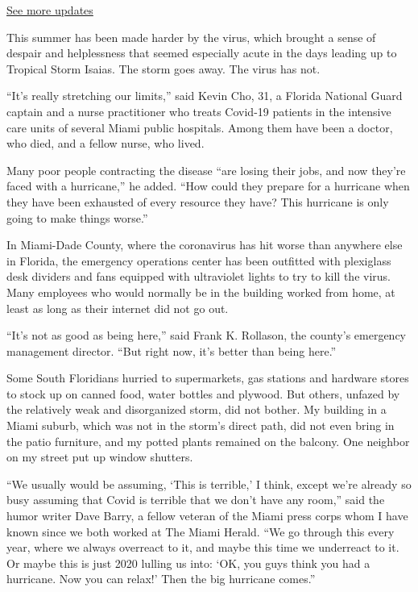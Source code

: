 \href{https://www.nytimes.com/2020/08/04/us/isaias-storm-updates.html?action=click\&pgtype=Article\&state=default\&region=MAIN_CONTENT_1\&context=storylines_live_updates}{See
more updates}

This summer has been made harder by the virus, which brought a sense of
despair and helplessness that seemed especially acute in the days
leading up to Tropical Storm Isaias. The storm goes away. The virus has
not.

``It's really stretching our limits,'' said Kevin Cho, 31, a Florida
National Guard captain and a nurse practitioner who treats Covid-19
patients in the intensive care units of several Miami public hospitals.
Among them have been a doctor, who died, and a fellow nurse, who lived.

Many poor people contracting the disease ``are losing their jobs, and
now they're faced with a hurricane,'' he added. ``How could they prepare
for a hurricane when they have been exhausted of every resource they
have? This hurricane is only going to make things worse.''

In Miami-Dade County, where the coronavirus has hit worse than anywhere
else in Florida, the emergency operations center has been outfitted with
plexiglass desk dividers and fans equipped with ultraviolet lights to
try to kill the virus. Many employees who would normally be in the
building worked from home, at least as long as their internet did not go
out.

``It's not as good as being here,'' said Frank K. Rollason, the county's
emergency management director. ``But right now, it's better than being
here.''

Some South Floridians hurried to supermarkets, gas stations and hardware
stores to stock up on canned food, water bottles and plywood. But
others, unfazed by the relatively weak and disorganized storm, did not
bother. My building in a Miami suburb, which was not in the storm's
direct path, did not even bring in the patio furniture, and my potted
plants remained on the balcony. One neighbor on my street put up window
shutters.

``We usually would be assuming, `This is terrible,' I think, except
we're already so busy assuming that Covid is terrible that we don't have
any room,'' said the humor writer Dave Barry, a fellow veteran of the
Miami press corps whom I have known since we both worked at The Miami
Herald. ``We go through this every year, where we always overreact to
it, and maybe this time we underreact to it. Or maybe this is just 2020
lulling us into: `OK, you guys think you had a hurricane. Now you can
relax!' Then the big hurricane comes.''

